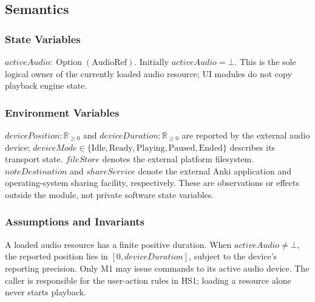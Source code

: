 \documentclass[12pt, titlepage]{article}
\begin{document}
\subsection{Semantics}
\subsubsection{State Variables}
$activeAudio : \operatorname{Option}(\mathrm{AudioRef})$.
Initially $activeAudio=\bot$. This is the sole logical owner of the
currently loaded audio resource; UI modules do not copy playback
engine state.

\subsubsection{Environment Variables}
$devicePosition:\mathbb{R}_{\geq0}$ and
$deviceDuration:\mathbb{R}_{\geq0}$ are reported by the external
audio device; $deviceMode\in\{\mathrm{Idle},\mathrm{Ready},
\mathrm{Playing},\mathrm{Paused},\mathrm{Ended}\}$ describes its
transport state. $fileStore$ denotes the external platform filesystem.
$noteDestination$ and $shareService$ denote the external Anki
application and operating-system sharing facility, respectively.
These are observations or effects outside the module, not private
software state variables.

\subsubsection{Assumptions and Invariants}
A loaded audio resource has a finite positive duration.
When $activeAudio\neq\bot$, the reported position lies in
$[0,deviceDuration]$, subject to the device's reporting precision.
Only M1 may issue commands to its active audio device.
The caller is responsible for the user-action rules in HS1;
loading a resource alone never starts playback.
\end{document}
